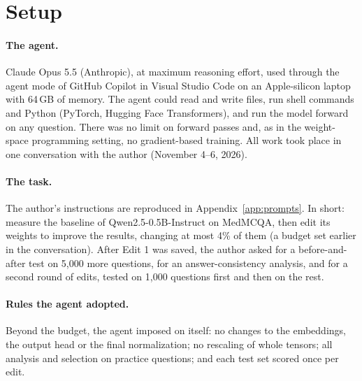 \documentclass[11pt]{article}
\begin{document}
\section{Setup}
\label{sec:setup}

\paragraph{The agent.} Claude Opus 5.5 (Anthropic), at maximum reasoning effort, used through the agent mode of GitHub Copilot in Visual Studio Code on an Apple-silicon laptop with 64\,GB of memory. The agent could read and write files, run shell commands and Python (PyTorch, Hugging Face Transformers), and run the model forward on any question. There was no limit on forward passes and, as in the weight-space programming setting, no gradient-based training. All work took place in one conversation with the author (November 4--6, 2026).

\paragraph{The task.} The author's instructions are reproduced in Appendix~\ref{app:prompts}. In short: measure the baseline of Qwen2.5-0.5B-Instruct on MedMCQA, then edit its weights to improve the results, changing at most 4\% of them (a budget set earlier in the conversation). After Edit 1 was saved, the author asked for a before-and-after test on 5{,}000 more questions, for an answer-consistency analysis, and for a second round of edits, tested on 1{,}000 questions first and then on the rest.

\paragraph{Rules the agent adopted.} Beyond the budget, the agent imposed on itself: no changes to the embeddings, the output head or the final normalization; no rescaling of whole tensors; all analysis and selection on practice questions; and each test set scored once per edit.
\end{document}
